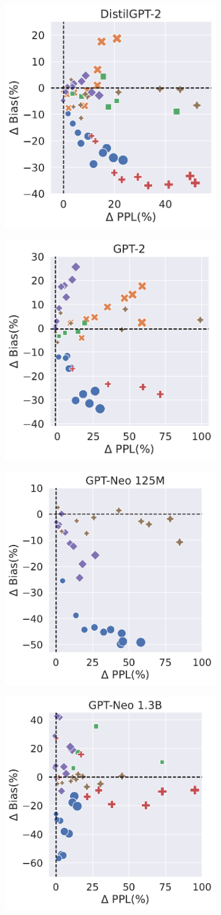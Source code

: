 \documentclass[letterpaper]{article} %
\newcommand{\goncalo}[1]
{\textcolor{orange}{{\bf}{\em #1}{\bf}}}
\begin{document}
\begin{figure}[t]
     \centering
    \begin{subfigure}
    \centering    \includegraphics[width=0.3\linewidth]{figures/camera_Ready_gender_bias_red_DistilGPT-2_gender_and_sex_2.pdf}
     \end{subfigure}
   \begin{subfigure}
    \centering    \includegraphics[width=0.3\linewidth]{figures/camera_Ready_gender_bias_red_GPT-2_gender_and_sex_2.pdf}
     \end{subfigure}
     \begin{subfigure}
    \centering    \includegraphics[width=0.31\linewidth]{figures/camera_Ready_gender_bias_red_GPT-Neo_125M_gender_and_sex_2.pdf}
     \end{subfigure}
     \begin{subfigure}
    \centering    \includegraphics[width=0.31\linewidth]{figures/camera_Ready_gender_bias_red_GPT-Neo_1.3B_gender_and_sex_2.pdf}

\end{subfigure}
\end{figure}
\end{document}
